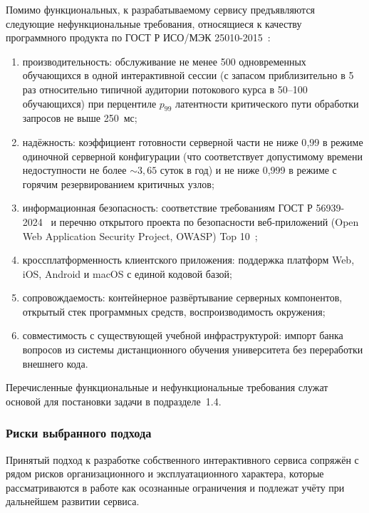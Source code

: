 Помимо функциональных, к разрабатываемому сервису предъявляются
следующие нефункциональные требования, относящиеся к качеству
программного продукта по ГОСТ Р ИСО/МЭК 25010-2015~\cite{gost25010}:
\begin{enumerate}
    \item производительность: обслуживание не менее 500 одновременных
          обучающихся в одной интерактивной сессии (с запасом
          приблизительно в 5 раз относительно типичной аудитории
          потокового курса в 50--100 обучающихся) при перцентиле
          $p_{99}$ латентности критического пути обработки запросов
          не выше 250~мс;
    \item надёжность: коэффициент готовности серверной части не ниже
          0{,}99 в режиме одиночной серверной конфигурации (что
          соответствует допустимому времени недоступности не более
          ${\sim}3{,}65$ суток в год) и не ниже 0{,}999 в режиме
          с горячим резервированием критичных узлов;
    \item информационная безопасность: соответствие требованиям
          ГОСТ Р 56939-2024~\cite{gost56939} и перечню открытого
          проекта по безопасности веб-приложений (Open Web Application
          Security Project, OWASP) Top 10~\cite{owasp_top10};
    \item кроссплатформенность клиентского приложения: поддержка
          платформ Web, iOS, Android и macOS с единой кодовой базой;
    \item сопровождаемость: контейнерное развёртывание серверных
          компонентов, открытый стек программных средств,
          воспроизводимость окружения;
    \item совместимость с существующей учебной инфраструктурой:
          импорт банка вопросов из системы дистанционного обучения
          университета без переработки внешнего кода.
\end{enumerate}

Перечисленные функциональные и нефункциональные требования служат
основой для постановки задачи в подразделе~1.4.

\subsubsection{Риски выбранного подхода}

Принятый подход к разработке собственного интерактивного сервиса
сопряжён с рядом рисков организационного и эксплуатационного
характера, которые рассматриваются в работе как осознанные
ограничения и подлежат учёту при дальнейшем развитии сервиса.

